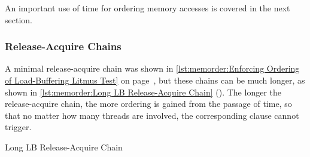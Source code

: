 \QuickQuizEnd

An important use of time for ordering memory accesses is covered in the
next section.

\subsubsection{Release-Acquire Chains}
\label{sec:memorder:Release-Acquire Chains}

A minimal release-acquire chain was shown in
\cref{lst:memorder:Enforcing Ordering of Load-Buffering Litmus Test}
on
page~\pageref{lst:memorder:Enforcing Ordering of Load-Buffering Litmus Test},
but these chains can be much longer, as shown in
\cref{lst:memorder:Long LB Release-Acquire Chain}
().
The longer the release-acquire chain, the more ordering is gained
from the passage of time, so that no matter how many threads are
involved, the corresponding  clause cannot trigger.

\begin{listing}

\caption{Long LB Release-Acquire Chain}
\label{lst:memorder:Long LB Release-Acquire Chain}
\end{listing}

